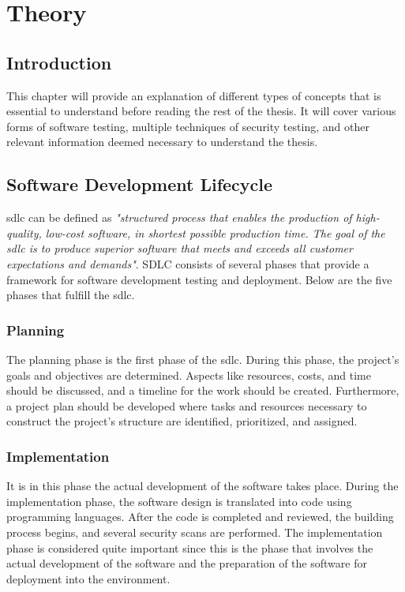 \chapter{Theory}
\label{chap:Theory}

\section{Introduction}
This chapter will provide an explanation of different types of concepts that is essential to understand before reading the rest of the thesis. It will cover various forms of software testing, multiple techniques of security testing, and other relevant information deemed necessary to understand the thesis.


\section{Software Development Lifecycle}
\acrlong{sdlc} can be defined as \textit{"structured process that enables the production of high-quality, low-cost software, in shortest possible production time. The goal of the \acrshort{sdlc} is to produce superior software that meets and exceeds all customer expectations and demands"}\cite{sdlc1}.  SDLC consists of several phases that provide a framework for software development testing and deployment. Below are the five phases that fulfill the \acrshort{sdlc}. 

\subsection{Planning} 
The planning phase is the first phase of the \acrshort{sdlc}. During this phase, the project's goals and objectives are determined. Aspects like resources, costs, and time should be discussed, and a timeline for the work should be created.  Furthermore, a project plan should be developed where tasks and resources necessary to construct the project's structure are identified, prioritized, and assigned. \cite{planningphase}
 
\subsection{Implementation}
It is in this phase the actual development of the software takes place. During the implementation phase, the software design is translated into code using programming languages. After the code is completed and reviewed, the building process begins, and several security scans are performed.
The implementation phase is considered quite important since this is the phase that involves the actual development of the software and the preparation of the software for deployment into the environment.  \cite{ImplementationSDLC}
 
